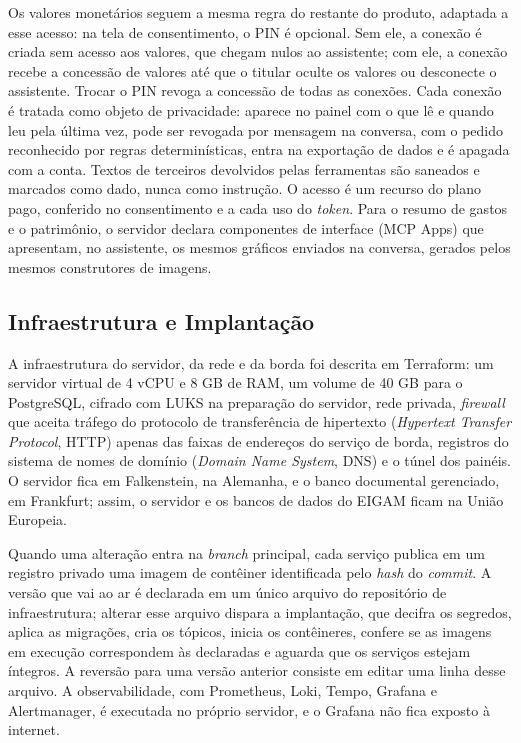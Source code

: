 Os valores monetários seguem a mesma regra do restante do produto, adaptada a esse acesso: na tela de consentimento, o PIN é opcional. Sem ele, a conexão é criada sem acesso aos valores, que chegam nulos ao assistente; com ele, a conexão recebe a concessão de valores até que o titular oculte os valores ou desconecte o assistente. Trocar o PIN revoga a concessão de todas as conexões. Cada conexão é tratada como objeto de privacidade: aparece no painel com o que lê e quando leu pela última vez, pode ser revogada por mensagem na conversa, com o pedido reconhecido por regras determinísticas, entra na exportação de dados e é apagada com a conta. Textos de terceiros devolvidos pelas ferramentas são saneados e marcados como dado, nunca como instrução. O acesso é um recurso do plano pago, conferido no consentimento e a cada uso do \textit{token}. Para o resumo de gastos e o patrimônio, o servidor declara componentes de interface (MCP Apps) que apresentam, no assistente, os mesmos gráficos enviados na conversa, gerados pelos mesmos construtores de imagens.

\subsection{Infraestrutura e Implantação}

A infraestrutura do servidor, da rede e da borda foi descrita em Terraform: um servidor virtual de 4 vCPU e 8 GB de RAM, um volume de 40 GB para o PostgreSQL, cifrado com LUKS na preparação do servidor, rede privada, \textit{firewall} que aceita tráfego do protocolo de transferência de hipertexto (\textit{Hypertext Transfer Protocol}, HTTP) apenas das faixas de endereços do serviço de borda, registros do sistema de nomes de domínio (\textit{Domain Name System}, DNS) e o túnel dos painéis. O servidor fica em Falkenstein, na Alemanha, e o banco documental gerenciado, em Frankfurt; assim, o servidor e os bancos de dados do EIGAM ficam na União Europeia.

Quando uma alteração entra na \textit{branch} principal, cada serviço publica em um registro privado uma imagem de contêiner identificada pelo \textit{hash} do \textit{commit}. A versão que vai ao ar é declarada em um único arquivo do repositório de infraestrutura; alterar esse arquivo dispara a implantação, que decifra os segredos, aplica as migrações, cria os tópicos, inicia os contêineres, confere se as imagens em execução correspondem às declaradas e aguarda que os serviços estejam íntegros. A reversão para uma versão anterior consiste em editar uma linha desse arquivo. A observabilidade, com Prometheus, Loki, Tempo, Grafana e Alertmanager, é executada no próprio servidor, e o Grafana não fica exposto à internet.

